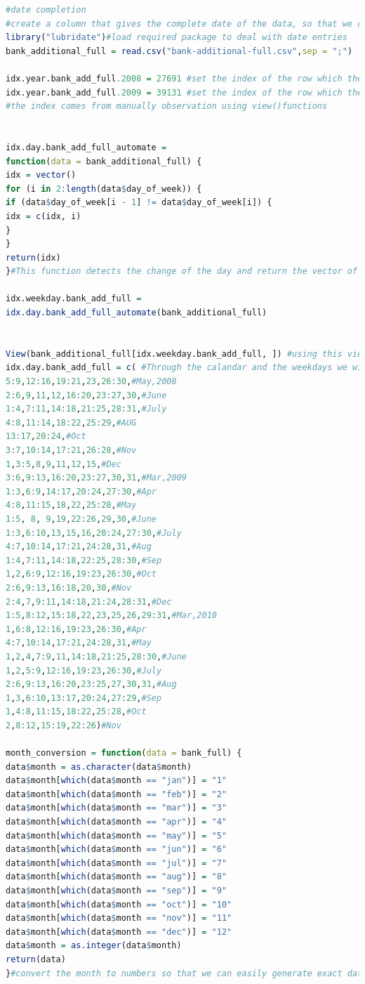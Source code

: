 \documentclass[12pt, a4paper, bibliography=totoc, english]{scrartcl}
\begin{document}
\begin{lstlisting}[language = R]
#date completion
#create a column that gives the complete date of the data, so that we could add other economical data
library("lubridate")#load required package to deal with date entries
bank_additional_full = read.csv("bank-additional-full.csv",sep = ";")

idx.year.bank_add_full.2008 = 27691 #set the index of the row which the year changed from 2008 to 2009
idx.year.bank_add_full.2009 = 39131 #set the index of the row which the year changed from 2009 to 2010
#the index comes from manually observation using view()functions


idx.day.bank_add_full_automate =
function(data = bank_additional_full) {
idx = vector()
for (i in 2:length(data$day_of_week)) {
if (data$day_of_week[i - 1] != data$day_of_week[i]) {
idx = c(idx, i)
}
}
return(idx)
}#This function detects the change of the day and return the vector of all the row numbers which the day changes

idx.weekday.bank_add_full =
idx.day.bank_add_full_automate(bank_additional_full)


View(bank_additional_full[idx.weekday.bank_add_full, ]) #using this view together with a calendar we are able to identify the exact date through simple deduction
idx.day.bank_add_full = c( #Through the calandar and the weekdays we will be able to identify the exact day of the month of each row
5:9,12:16,19:21,23,26:30,#May,2008
2:6,9,11,12,16:20,23:27,30,#June
1:4,7:11,14:18,21:25,28:31,#July
4:8,11:14,18:22,25:29,#AUG
13:17,20:24,#Oct
3:7,10:14,17:21,26:28,#Nov
1,3:5,8,9,11,12,15,#Dec
3:6,9:13,16:20,23:27,30,31,#Mar,2009
1:3,6:9,14:17,20:24,27:30,#Apr
4:8,11:15,18,22,25:28,#May
1:5, 8, 9,19,22:26,29,30,#June
1:3,6:10,13,15,16,20:24,27:30,#July
4:7,10:14,17:21,24:28,31,#Aug
1:4,7:11,14:18,22:25,28:30,#Sep
1,2,6:9,12:16,19:23,26:30,#Oct
2:6,9:13,16:18,20,30,#Nov
2:4,7,9:11,14:18,21:24,28:31,#Dec
1:5,8:12,15:18,22,23,25,26,29:31,#Mar,2010
1,6:8,12:16,19:23,26:30,#Apr
4:7,10:14,17:21,24:28,31,#May
1,2,4,7:9,11,14:18,21:25,28:30,#June
1,2,5:9,12:16,19:23,26:30,#July
2:6,9:13,16:20,23:25,27,30,31,#Aug
1,3,6:10,13:17,20:24,27:29,#Sep
1,4:8,11:15,18:22,25:28,#Oct
2,8:12,15:19,22:26)#Nov

month_conversion = function(data = bank_full) {
data$month = as.character(data$month)
data$month[which(data$month == "jan")] = "1"
data$month[which(data$month == "feb")] = "2"
data$month[which(data$month == "mar")] = "3"
data$month[which(data$month == "apr")] = "4"
data$month[which(data$month == "may")] = "5"
data$month[which(data$month == "jun")] = "6"
data$month[which(data$month == "jul")] = "7"
data$month[which(data$month == "aug")] = "8"
data$month[which(data$month == "sep")] = "9"
data$month[which(data$month == "oct")] = "10"
data$month[which(data$month == "nov")] = "11"
data$month[which(data$month == "dec")] = "12"
data$month = as.integer(data$month)
return(data)
}#convert the month to numbers so that we can easily generate exact date


\end{lstlisting}
\end{document}
